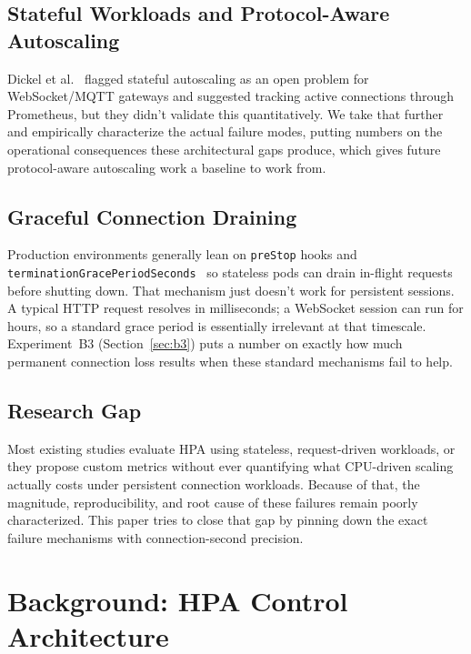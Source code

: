 \documentclass[pdflatex,sn-mathphys-num]{sn-jnl}
\theoremstyle{thmstyleone}%
\theoremstyle{thmstyletwo}%
\theoremstyle{thmstylethree}%
\begin{document}
\subsection{Stateful Workloads and Protocol-Aware Autoscaling}

Dickel et al.~\cite{dickel2019evaluation} flagged stateful autoscaling as an open
problem for WebSocket/MQTT gateways and suggested tracking active connections
through Prometheus, but they didn't validate this quantitatively. We take that
further and empirically characterize the actual failure modes, putting numbers on
the operational consequences these architectural gaps produce, which gives future
protocol-aware autoscaling work a baseline to work from.

\subsection{Graceful Connection Draining}

Production environments generally lean on \texttt{preStop} hooks and
\texttt{terminationGracePeriodSeconds}~\cite{k8s_container_lifecycle_hooks} so
stateless pods can drain in-flight requests before shutting down. That mechanism
just doesn't work for persistent sessions. A typical HTTP request resolves in
milliseconds; a WebSocket session can run for hours, so a standard grace period is
essentially irrelevant at that timescale. Experiment~B3 (Section~\ref{sec:b3})
puts a number on exactly how much permanent connection loss results when these
standard mechanisms fail to help.

\subsection{Research Gap}

Most existing studies evaluate HPA using stateless, request-driven workloads, or
they propose custom metrics without ever quantifying what CPU-driven scaling
actually costs under persistent connection workloads. Because of that, the
magnitude, reproducibility, and root cause of these failures remain poorly
characterized. This paper tries to close that gap by pinning down the exact
failure mechanisms with connection-second precision.



\section{Background: HPA Control Architecture}
\label{sec:background}
\end{document}
